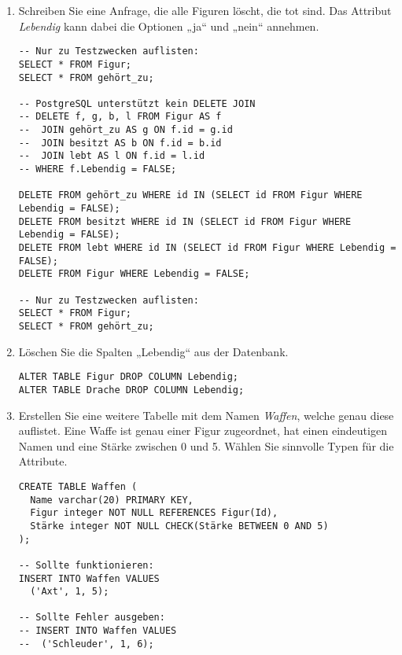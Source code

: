 \documentclass{lehramt-informatik-aufgabe}
\begin{document}
\begin{enumerate}
%

\item Schreiben Sie eine Anfrage, die alle Figuren löscht, die tot sind.
Das Attribut \emph{Lebendig} kann dabei die Optionen „ja“ und „nein“
annehmen.

\begin{liAntwort}
\begin{verbatim}
-- Nur zu Testzwecken auflisten:
SELECT * FROM Figur;
SELECT * FROM gehört_zu;

-- PostgreSQL unterstützt kein DELETE JOIN
-- DELETE f, g, b, l FROM Figur AS f
--  JOIN gehört_zu AS g ON f.id = g.id
--  JOIN besitzt AS b ON f.id = b.id
--  JOIN lebt AS l ON f.id = l.id
-- WHERE f.Lebendig = FALSE;

DELETE FROM gehört_zu WHERE id IN (SELECT id FROM Figur WHERE Lebendig = FALSE);
DELETE FROM besitzt WHERE id IN (SELECT id FROM Figur WHERE Lebendig = FALSE);
DELETE FROM lebt WHERE id IN (SELECT id FROM Figur WHERE Lebendig = FALSE);
DELETE FROM Figur WHERE Lebendig = FALSE;

-- Nur zu Testzwecken auflisten:
SELECT * FROM Figur;
SELECT * FROM gehört_zu;
\end{verbatim}
\end{liAntwort}

%

\item Löschen Sie die Spalten „Lebendig“ aus der Datenbank.

\begin{liAntwort}
\begin{verbatim}
ALTER TABLE Figur DROP COLUMN Lebendig;
ALTER TABLE Drache DROP COLUMN Lebendig;
\end{verbatim}
\end{liAntwort}

%

\item Erstellen Sie eine weitere Tabelle mit dem Namen \emph{Waffen},
welche genau diese auflistet. Eine Waffe ist genau einer Figur
zugeordnet, hat einen eindeutigen Namen und eine Stärke zwischen 0 und
5. Wählen Sie sinnvolle Typen für die Attribute.

\begin{liAntwort}
\begin{verbatim}
CREATE TABLE Waffen (
  Name varchar(20) PRIMARY KEY,
  Figur integer NOT NULL REFERENCES Figur(Id),
  Stärke integer NOT NULL CHECK(Stärke BETWEEN 0 AND 5)
);

-- Sollte funktionieren:
INSERT INTO Waffen VALUES
  ('Axt', 1, 5);

-- Sollte Fehler ausgeben:
-- INSERT INTO Waffen VALUES
--  ('Schleuder', 1, 6);
\end{verbatim}
\end{liAntwort}
\end{enumerate}
\end{document}

